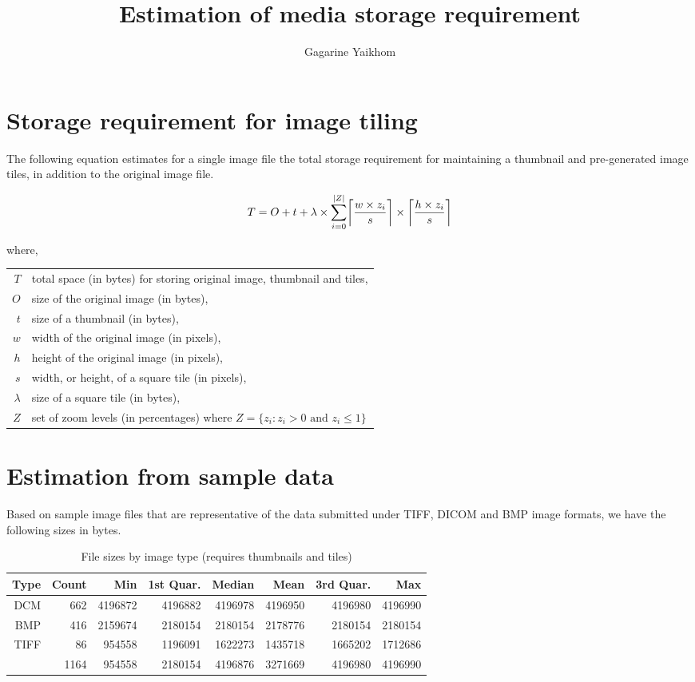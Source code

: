 \documentclass[a4paper]{amsart}
\title{Estimation of media storage requirement}
\author{Gagarine Yaikhom}
\DeclarePairedDelimiter\ceil{\lceil}{\rceil}
\begin{document}
\maketitle

\section{Storage requirement for image tiling}

The following equation estimates for a single image file the total
storage requirement for maintaining a thumbnail and pre-generated
image tiles, in addition to the original image file.

$$
T = O + t + \lambda\times\sum_{i=0}^{|Z|}\ceil*{\frac{w \times z_i}{s}} \times \ceil*{\frac{h \times z_i}{s}}
$$

where,
\begin{table}[ht]
\begin{tabular}{rl}
$T$ & total space (in bytes) for storing original image, thumbnail and tiles,\\
$O$ & size of the original image (in bytes),\\
$t$ & size of a thumbnail (in bytes),\\
$w$ & width of the original image (in pixels),\\
$h$ & height of the original image (in pixels),\\
$s$ & width, or height, of a square tile (in pixels),\\
$\lambda$ & size of a square tile (in bytes),\\
$Z$ & set of zoom levels (in percentages) where $Z = \{z_i : z_i > 0 \textrm{ and } z_i \le 1\}$
\end{tabular}
\end{table}

\section{Estimation from sample data}

Based on sample image files that are representative of the data
submitted under TIFF, DICOM and BMP image formats, we have the
following sizes in bytes.

\begin{table}[ht]
\begin{tabular}{r|rrrrrrr}
  Type & Count & Min & 1st Quar. & Median & Mean & 3rd Quar. & Max\\\hline
  DCM & 662 & 4196872 & 4196882 & 4196978 & 4196950 & 4196980 & 4196990\\
  BMP & 416 & 2159674 & 2180154 & 2180154 & 2178776 & 2180154 & 2180154\\
  TIFF & 86 & 954558 & 1196091 & 1622273 & 1435718 & 1665202 & 1712686\\\hline
 & 1164 & 954558 & 2180154 & 4196876 & 3271669 & 4196980 & 4196990
\end{tabular}
\caption{File sizes by image type (requires thumbnails and tiles)}
\end{table}
\end{document}
